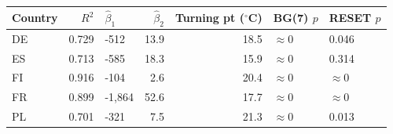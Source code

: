
\begin{tabular}{lrlrrll}
\toprule
Country & $R^2$ & $\hat{\beta}_1$ & $\hat{\beta}_2$ & Turning pt ($^\circ$C) & BG(7) $p$ & RESET $p$\\
\midrule
DE & 0.729 & -512 & 13.9 & 18.5 & $\approx 0$ & 0.046\\
ES & 0.713 & -585 & 18.3 & 15.9 & $\approx 0$ & 0.314\\
FI & 0.916 & -104 & 2.6 & 20.4 & $\approx 0$ & $\approx 0$\\
FR & 0.899 & -1,864 & 52.6 & 17.7 & $\approx 0$ & $\approx 0$\\
PL & 0.701 & -321 & 7.5 & 21.3 & $\approx 0$ & 0.013\\
\bottomrule
\end{tabular}
